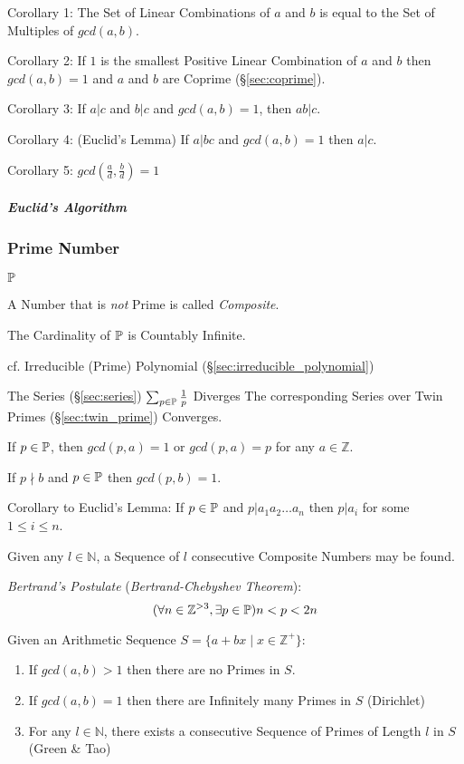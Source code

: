 Corollary 1: The Set of Linear Combinations of $a$ and $b$ is equal to
the Set of Multiples of $gcd(a,b)$.

Corollary 2: If $1$ is the smallest Positive Linear Combination of $a$
and $b$ then $gcd(a,b) = 1$ and $a$ and $b$ are Coprime
(\S\ref{sec:coprime}).

Corollary 3: If $a|c$ and $b|c$ and $gcd(a,b) = 1$, then $ab|c$.

Corollary 4: (Euclid's Lemma) If $a | bc$ and $gcd(a,b) = 1$ then
$a|c$.

Corollary 5: $gcd(\frac{a}{d}, \frac{b}{d}) = 1$



\subparagraph{Euclid's Algorithm}\label{sec:euclids_algorithm}\hfill



\subsubsection{Prime Number}\label{sec:prime_number}

$\mathbb{P}$

A Number that is \emph{not} Prime is called \emph{Composite}.

The Cardinality of $\mathbb{P}$ is Countably Infinite.

cf. Irreducible (Prime) Polynomial (\S\ref{sec:irreducible_polynomial})

The Series (\S\ref{sec:series}) $\sum_{p \in \mathbb{P}} \frac{1}{p}$ Diverges The
corresponding Series over Twin Primes (\S\ref{sec:twin_prime}) Converges.

If $p \in \mathbb{P}$, then $gcd(p,a) = 1$ or $gcd(p,a) = p$ for any
$a \in \mathbb{Z}$.

If $p \nmid b$ and $p \in \mathbb{P}$ then $gcd (p,b) = 1$.

Corollary to Euclid's Lemma: If $p \in \mathbb{P}$ and
$p|a_1 a_2 \ldots a_n$ then $p|a_i$ for some $1 \leq i \leq n$.

Given any $l \in \mathbb{N}$, a Sequence of $l$ consecutive Composite
Numbers may be found.

\emph{Bertrand's Postulate} (\emph{Bertrand-Chebyshev Theorem}):
\[
  (\forall n \in \mathbb{Z}^{>3}, \exists p \in \mathbb{P}) n < p < 2n
\]

Given an Arithmetic Sequence $S = \{ a + bx \;|\; x \in \mathbb{Z}^+\}$:
\begin{enumerate}
  \item If $gcd(a,b) > 1$ then there are no Primes in $S$.
  \item If $gcd(a,b) = 1$ then there are Infinitely many Primes in $S$
    (Dirichlet)
  \item For any $l \in \mathbb{N}$, there exists a consecutive
    Sequence of Primes of Length $l$ in $S$ (Green \& Tao)
\end{enumerate}

